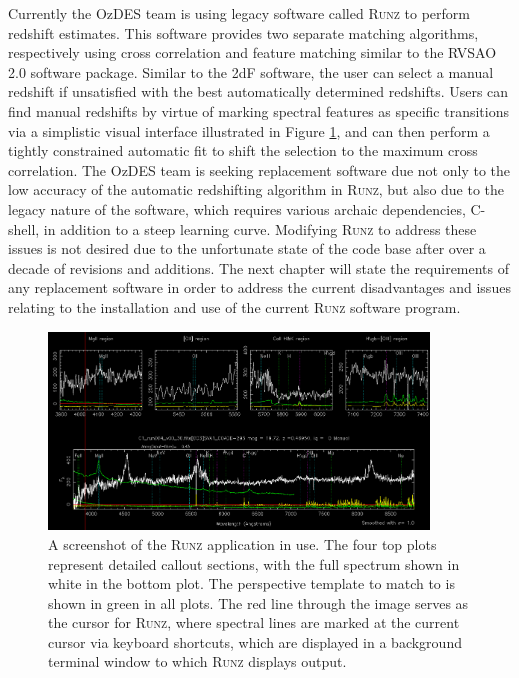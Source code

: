 \documentclass[titlesmallcaps, examinerscopy, copyrightpage]{uqthesis}
\newcommand{\runz}{\textsc{Runz}}
\begin{document}
Currently the OzDES team is using legacy software called \runz{} to perform redshift estimates. This software provides two separate matching algorithms, respectively using cross correlation and feature matching similar to the RVSAO 2.0 software package. Similar to the 2dF software, the user can select a manual redshift if unsatisfied with the best automatically determined redshifts. Users can find manual redshifts by virtue of marking spectral features as specific transitions via a simplistic visual interface illustrated in Figure \ref{fig:runz}, and can then perform a tightly constrained  automatic fit to shift the selection to the maximum cross correlation. The OzDES team is seeking replacement software due not only to the low accuracy of the automatic redshifting algorithm in \runz{}, but also due to the legacy nature of the software, which requires various archaic dependencies, C-shell, in addition to a steep learning curve. Modifying \runz{} to address these issues is not desired due to the unfortunate state of the code base after over a decade of revisions and additions. The next chapter will state the requirements of any replacement software in order to address the current disadvantages and issues relating to the installation and use of the current \runz{} software program.

\begin{figure}[ht!]
\includegraphics[width=0.9\textwidth]{images/RunzScreen.PNG} 
\centering
\caption{A screenshot of the \runz{} application in use. The four top plots represent detailed callout sections, with the full spectrum shown in white in the bottom plot. The perspective template to match to is shown in green in all plots. The red line through the image serves as the cursor for \runz{}, where spectral lines are marked at the current cursor via keyboard shortcuts, which are displayed in a background terminal window to which \runz{} displays output.}
\label{fig:runz}
\end{figure}
\end{document}
